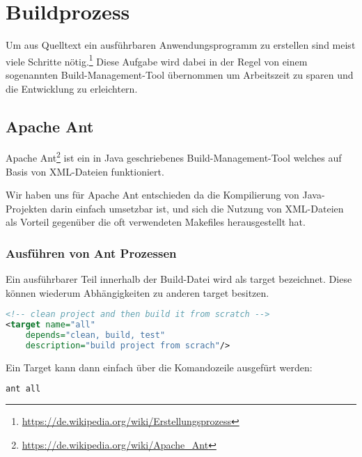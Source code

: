 

\section{Buildprozess}

Um aus Quelltext ein ausf\"uhrbaren Anwendungsprogramm zu erstellen sind meist viele Schritte nötig.\footnote{\url{https://de.wikipedia.org/wiki/Erstellungsprozess}} Diese Aufgabe wird dabei in der Regel von einem sogenannten Build-Management-Tool \"ubernommen um Arbeitszeit zu sparen und die Entwicklung zu erleichtern.

\subsection{Apache Ant}

Apache Ant\footnote{\url{https://de.wikipedia.org/wiki/Apache_Ant}} ist ein in Java geschriebenes Build-Management-Tool welches auf Basis von XML-Dateien funktioniert.

Wir haben uns f\"ur Apache Ant entschieden da die Kompilierung von Java-Projekten darin einfach umsetzbar ist, und sich die Nutzung von XML-Dateien als Vorteil gegen\"uber die oft verwendeten Makefiles herausgestellt hat.

\subsubsection{Ausf\"uhren von Ant Prozessen}

Ein ausf\"uhrbarer Teil innerhalb der Build-Datei wird als target bezeichnet. Diese k\"onnen wiederum Abh\"angigkeiten zu anderen target besitzen.

\begin{lstlisting}[language=XML]
<!-- clean project and then build it from scratch -->
<target name="all"
	depends="clean, build, test"
	description="build project from scrach"/>
\end{lstlisting}

Ein Target kann dann einfach \"uber die Komandozeile ausgef\"urt werden:

\begin{lstlisting}[language=bash]
ant all
\end{lstlisting}